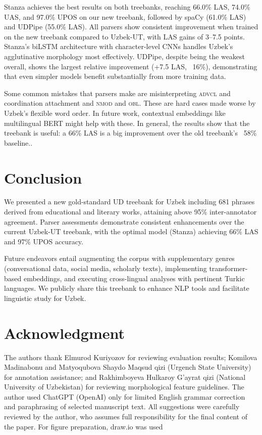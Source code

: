 \documentclass[10pt,conference,a4paper]{IEEEtran_EDM}
\begin{document}
Stanza achieves the best results on both treebanks, reaching 66.0\% LAS, 74.0\% UAS, and 97.0\% UPOS on our new treebank, followed by spaCy (61.0\% LAS) and UDPipe (55.0\% LAS). All parsers show consistent improvement when trained on the new treebank compared to Uzbek-UT, with LAS gains of 3--7.5 points. Stanza's biLSTM architecture with character-level CNNs\cite{zhai-etal-2018-comparing} handles Uzbek's agglutinative morphology most effectively. UDPipe, despite being the weakest overall, shows the largest relative improvement (+7.5 LAS, ~16\%), demonstrating that even simpler models benefit substantially from more training data.

Some common mistakes that parsers make are misinterpreting \textsc{advcl} and coordination attachment and \textsc{nmod} and \textsc{obl}. These are hard cases made worse by Uzbek's flexible word order. In future work, contextual embeddings like multilingual BERT might help with these. In general, the results show that the treebank is useful: a 66\% LAS is a big improvement over the old treebank's ~58\% baseline..

\section{Conclusion}

We presented a new gold-standard UD treebank for Uzbek including 681 phrases derived from educational and literary works, attaining above 95\% inter-annotator agreement. Parser assessments demonstrate consistent enhancements over the current Uzbek-UT treebank, with the optimal model (Stanza) achieving 66\% LAS and 97\% UPOS accuracy.

Future endeavors entail augmenting the corpus with supplementary genres (conversational data, social media, scholarly texts), implementing transformer-based embeddings, and executing cross-lingual analyses with pertinent Turkic languages. We publicly share this treebank to enhance NLP tools and facilitate linguistic study for Uzbek.

\section*{Acknowledgment}
The authors thank Elmurod Kuriyozov for reviewing evaluation results; Komilova Madinabonu and Matyoqubova Shaydo Maqsud qizi (Urgench State University) for annotation assistance; and Rakhimboyeva Hulkaroy G'ayrat qizi (National University of Uzbekistan) for reviewing morphological feature guidelines. The author used ChatGPT (OpenAI) only for limited English grammar correction and paraphrasing of selected manuscript text. All suggestions were carefully reviewed by the author, who assumes full responsibility for the final content of the paper. For figure preparation, draw.io was used 



\end{document}
